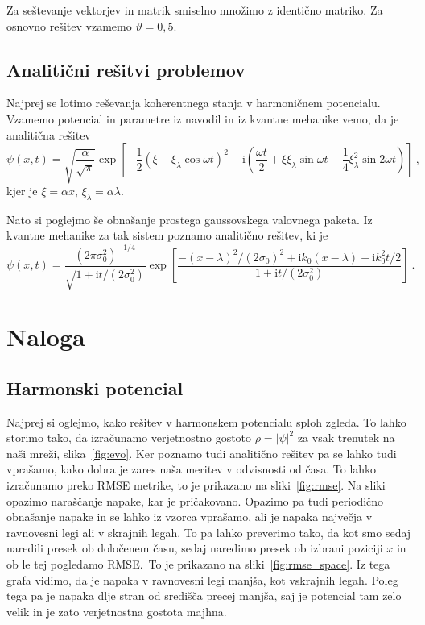 \documentclass{porocilo}
\newcommand{\ii}{\mathrm{i}}
\begin{document}
Za seštevanje vektorjev in matrik smiselno množimo z identično matriko. Za osnovno rešitev vzamemo $\vartheta = 0,5$.

\subsection{Analitični rešitvi problemov}
Najprej se lotimo reševanja koherentnega stanja v harmoničnem potencialu. Vzamemo potencial in parametre iz navodil in iz kvantne mehanike vemo, da je analitična rešitev
\begin{equation*}
    \psi(x,t)=\sqrt{\frac{\alpha}{\sqrt{\pi}}} \exp\left[-\frac12 {\left(\xi-\xi_\lambda \cos\omega t\right)}^2 - \ii \left(\frac{\omega t}{2}+\xi\xi_\lambda \sin\omega t - \frac14 \xi_\lambda^2 \sin 2 \omega t\right)\right]\>,
\end{equation*}
kjer je $\xi=\alpha x$, $\xi_\lambda=\alpha \lambda$.

Nato si poglejmo še obnašanje prostega gaussovskega valovnega paketa. Iz kvantne mehanike za tak sistem poznamo analitično rešitev, ki je
\begin{equation*}
    \psi(x,t)=\frac{{(2\pi \sigma_0^2)}^{-1/4}}{\sqrt{1+\ii t/(2\sigma_0^2)}} \exp\left[
    \frac{-{(x-\lambda)}^2/{(2\sigma_0)}^2+\ii k_0(x-\lambda)-\ii k_0^2 t/2}{1+\ii t/(2\sigma_0^2)}
    \right] \>.
\end{equation*}


\newpage
\section{Naloga}
\subsection{Harmonski potencial}
Najprej si oglejmo, kako rešitev v harmonskem potencialu sploh zgleda. To lahko storimo tako, da izračunamo verjetnostno gostoto $\rho = |\psi|^2$ za vsak trenutek na naši mreži, slika~\ref{fig:evo}. Ker poznamo tudi analitično rešitev pa se lahko tudi vprašamo, kako dobra je zares naša meritev v odvisnosti od časa. To lahko izračunamo preko RMSE metrike, to je prikazano na sliki~\ref{fig:rmse}. Na sliki opazimo naraščanje napake, kar je pričakovano. Opazimo pa tudi periodično obnašanje napake in se lahko iz vzorca vprašamo, ali je napaka največja v ravnovesni legi ali v skrajnih legah. To pa lahko preverimo tako, da kot smo sedaj naredili presek ob določenem času, sedaj naredimo presek ob izbrani poziciji $x$ in ob le tej pogledamo RMSE.~To je prikazano na sliki~\ref{fig:rmse_space}. Iz tega grafa vidimo, da je napaka v ravnovesni legi manjša, kot vskrajnih legah. Poleg tega pa je napaka dlje stran od središča precej manjša, saj je potencial tam zelo velik in je zato verjetnostna gostota majhna.
\end{document}
